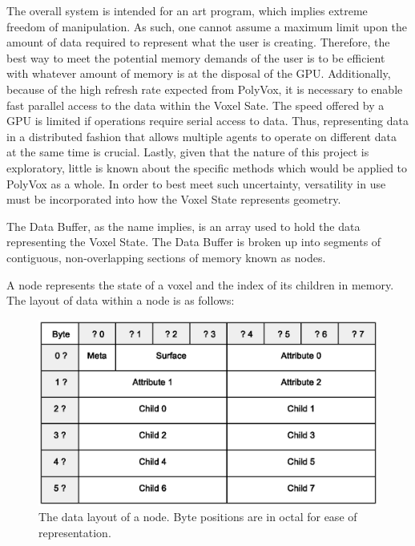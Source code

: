 \documentclass[onecolumn, draftclsnofoot,10pt, compsoc]{IEEEtran}
\newcounter{threesection}[subsubsection]
\newcounter{foursection}[threesection]
\begin{document}
The overall system is intended for an art program, which implies extreme freedom of manipulation. 
As such, one cannot assume a maximum limit upon the amount of data required to represent what the user is creating.
Therefore, the best way to meet the potential memory demands of the user is to be efficient with whatever amount of memory is at the disposal of the GPU.
Additionally, because of the high refresh rate expected from PolyVox, it is necessary to enable fast parallel access to the data within the Voxel Sate.
The speed offered by a GPU is limited if operations require serial access to data.
Thus, representing data in a distributed fashion that allows multiple agents to operate on different data at the same time is crucial.
Lastly, given that the nature of this project is exploratory, little is known about the specific methods which would be applied to PolyVox as a whole.
In order to best meet such uncertainty, versatility in use must be incorporated into how the Voxel State represents geometry.


The Data Buffer, as the name implies, is an array used to hold the data representing the Voxel State.
The Data Buffer is broken up into segments of contiguous, non-overlapping sections of memory known as nodes.

A node represents the state of a voxel and the index of its children in memory. The layout of data within a node is as follows: \\

\begin{figure}[H]
\begin{center}
\includegraphics[width=\textwidth, viewport=50 120 475 380, clip=true]{nodeLayout.eps}
\caption{The data layout of a node. Byte positions are in octal for ease of representation.}
\end{center}
\end{figure}
\end{document}
